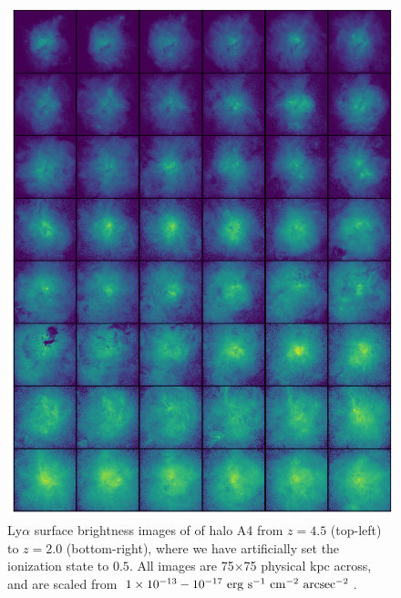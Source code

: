 \begin{figure}
    \centering
    \includegraphics[width=\textwidth,keepaspectratio]{figures/rogues_half_ionized.png}
    \caption{
        Ly$\alpha$ surface brightness images of of halo A4 from $z=4.5$ (top-left) to $z=2.0$ (bottom-right), where we have artificially set the ionization state to $0.5$.
        All images are 75$\times$75 physical kpc across, and are scaled from $1\times10^{-13}-10^{-17}\ \rm{erg}\ \rm{s}^{-1}\ \rm{cm}^{-2}\ \rm{arcsec}^{-2}$.
    }
  \label{fig:rogues_half_ionized}
\end{figure}


